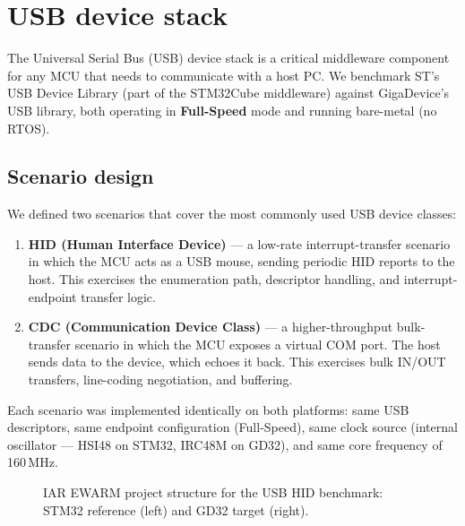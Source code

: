 \section{USB device stack}
\label{sec:gd32-usb}

The Universal Serial Bus (USB) device stack is a critical middleware component for any MCU
that needs to communicate with a host PC. We benchmark ST's USB Device Library (part of the
STM32Cube middleware) against GigaDevice's USB library, both operating in
\textbf{Full-Speed} mode and running bare-metal (no RTOS).

\subsection{Scenario design}
\label{sec:gd32-usb-scenarios}

We defined two scenarios that cover the most commonly used USB device classes:

\begin{enumerate}
  \item \textbf{HID (Human Interface Device)} --- a low-rate interrupt-transfer scenario in
    which the MCU acts as a USB mouse, sending periodic HID reports to the host. This
    exercises the enumeration path, descriptor handling, and interrupt-endpoint transfer
    logic.
  \item \textbf{CDC (Communication Device Class)} --- a higher-throughput bulk-transfer
    scenario in which the MCU exposes a virtual COM port. The host sends data to the
    device, which echoes it back. This exercises bulk IN/OUT transfers, line-coding
    negotiation, and buffering.
\end{enumerate}

Each scenario was implemented identically on both platforms: same USB descriptors, same
endpoint configuration (Full-Speed), same clock source (internal oscillator ---
HSI48 on STM32, IRC48M on GD32), and same core frequency of 160\,MHz.

\begin{figure}[H]
\centering
{}
\caption{IAR EWARM project structure for the USB HID benchmark: STM32 reference (left) and GD32 target (right).}
\label{fig:gd32-usb-iar}
\end{figure}

